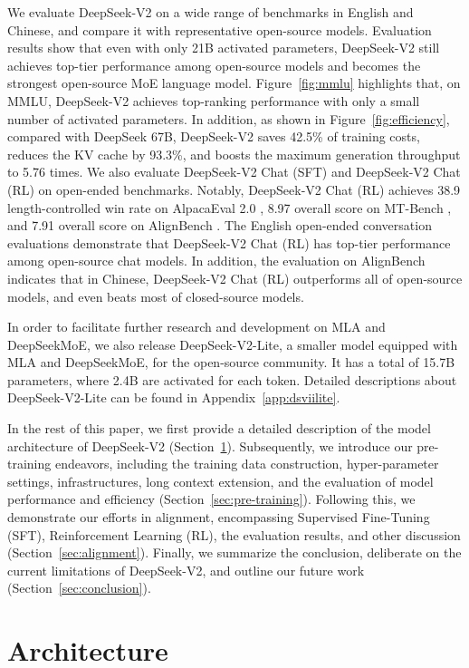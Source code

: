We evaluate DeepSeek-V2 on a wide range of benchmarks in English and Chinese, and compare it with representative open-source models. Evaluation results show that even with only 21B activated parameters, DeepSeek-V2 still achieves top-tier performance among open-source models and becomes the strongest open-source MoE language model. 
Figure~\ref{fig:mmlu} highlights that, on MMLU, DeepSeek-V2 achieves top-ranking performance with only a small number of activated parameters. In addition, as shown in Figure~\ref{fig:efficiency}, compared with DeepSeek 67B, DeepSeek-V2 saves 42.5\% of training costs, reduces the KV cache by 93.3\%, and boosts the maximum generation throughput to 5.76 times. We also evaluate DeepSeek-V2 Chat (SFT) and DeepSeek-V2 Chat (RL) on open-ended benchmarks. Notably, DeepSeek-V2 Chat (RL) achieves 38.9 length-controlled win rate on AlpacaEval 2.0 \citep{alpaca2.0}, 8.97 overall score on MT-Bench \citep{mtbench}, and 7.91 overall score on AlignBench \citep{align_bench}. The English open-ended conversation evaluations demonstrate that DeepSeek-V2 Chat (RL) has top-tier performance among open-source chat models. In addition, the evaluation on AlignBench indicates that in Chinese, DeepSeek-V2 Chat (RL) outperforms all of open-source models, and even beats most of closed-source models. 

In order to facilitate further research and development on MLA and DeepSeekMoE, we also release DeepSeek-V2-Lite, a smaller model equipped with MLA and DeepSeekMoE, for the open-source community. It has a total of 15.7B parameters, where 2.4B are activated for each token. Detailed descriptions about DeepSeek-V2-Lite can be found in Appendix~\ref{app:dsviilite}.

In the rest of this paper, we first provide a detailed description of the model architecture of DeepSeek-V2 (Section~\ref{sec:arch}). 
Subsequently, we introduce our pre-training endeavors, including the training data construction, hyper-parameter settings, infrastructures, long context extension, and the evaluation of model performance and efficiency (Section~\ref{sec:pre-training}). 
Following this, we demonstrate our efforts in alignment, encompassing Supervised Fine-Tuning (SFT), Reinforcement Learning (RL), the evaluation results, and other discussion (Section~\ref{sec:alignment}). 
Finally, we summarize the conclusion, deliberate on the current limitations of DeepSeek-V2, and outline our future work (Section~\ref{sec:conclusion}). 

\section{Architecture}
\label{sec:arch}

